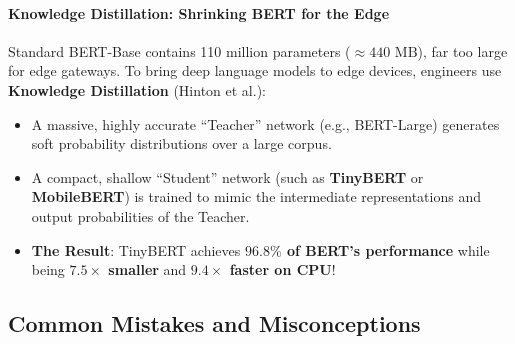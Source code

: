 \paragraph{Knowledge Distillation: Shrinking BERT for the Edge}
Standard BERT-Base contains 110 million parameters ($\approx 440\text{ MB}$), far too large for edge gateways. 
To bring deep language models to edge devices, engineers use \textbf{Knowledge Distillation} (Hinton et al.):
\begin{itemize}
    \item A massive, highly accurate ``Teacher'' network (e.g., BERT-Large) generates soft probability distributions over a large corpus.
    \item A compact, shallow ``Student'' network (such as \textbf{TinyBERT} or \textbf{MobileBERT}) is trained to mimic the intermediate representations and output probabilities of the Teacher.
    \item \textbf{The Result}: TinyBERT achieves \textbf{$96.8\%$ of BERT's performance} while being \textbf{$7.5\times$ smaller} and \textbf{$9.4\times$ faster on CPU}!
\end{itemize}

\subsection{Common Mistakes and Misconceptions}\label{subsec:mistakes}


